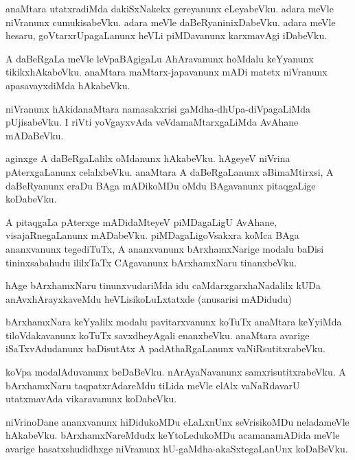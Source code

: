 \documentclass{article}
\begin{document}
\begin{mn}%
anaMtara utatxradiMda dakiSxNakekx gereyanunx eLeyabeVku. adara meVle
niVranunx cumukisabeVku. adara meVle daBeRyaninixDabeVku. adara meVle
hesaru, goVtarxrUpagaLanunx heVLi piMDavanunx karxmavAgi iDabeVku.
\end{mn}

\begin{mn}%
A daBeRgaLa meVle leVpaBAgigaLu AhAravanunx hoMdalu keYyanunx
tikikxhAkabeVku. anaMtara maMtarx-japavanunx mADi matetx niVranunx
apasavayxdiMda hAkabeVku.
\end{mn}

\begin{mn}
niVranunx hAkidanaMtara namasakxrisi gaMdha-dhUpa-diVpagaLiMda
pUjisabeVku. I riVti yoVgayxvAda veVdamaMtarxgaLiMda AvAhane mADaBeVku.
\end{mn}

\begin{mn}
aginxge A daBeRgaLalilx oMdanunx hAkabeVku. hAgeyeV niVrina
pAterxgaLanunx celalxbeVku. anaMtara A daBeRgaLanunx aBimaMtirxsi, A
daBeRyanunx eraDu BAga mADikoMDu oMdu BAgavanunx pitaqgaLige koDabeVku.
\end{mn}

\begin{mn}%
A pitaqgaLa pAterxge mADidaMteyeV piMDagaLigU AvAhane,
visajaRnegaLanunx mADabeVku. piMDagaLigoVsakxra koMca BAga ananxvanunx
tegediTuTx, A ananxvanunx bArxhamxNarige modalu baDisi tininxsabahudu
ililxTaTx CAgavanunx bArxhamxNaru tinanxbeVku.
\end{mn}

\begin{mn}%
hAge  bArxhamxNaru tinunxvudariMda idu caMdarxgarxhaNadalilx kUDa
anAvxhArayxkaveMdu heVLisikoLuLxtatxde (anusarisi mADidudu)
\end{mn}

\begin{mn}
bArxhamxNara keYyalilx modalu pavitarxvanunx koTuTx anaMtara keYyiMda
tiloVdakavanunx koTuTx savxdheyAgali enanxbeVku. anaMtara avarige
iSaTxvAdudanunx baDisutAtx A padAthaRgaLanunx vaNiRsutitxrabeVku.
\end{mn}

\begin{mn}
koVpa modalAduvanunx beDaBeVku. nArAyaNavanunx samxrisutitxrabeVku. A
bArxhamxNaru taqpatxrAdareMdu tiLida meVle elAlx vaNaRdavarU
utatxmavAda vikaravanunx koDabeVku.
\end{mn}

\begin{mn}
niVrinoDane ananxvanunx hiDidukoMDu eLaLxnUnx seVrisikoMDu neladameVle
hAkabeVku. bArxhamxNareMdudx keYtoLedukoMDu acamanamADida meVle
avarige hasatxshudidhxge niVranunx hU-gaMdha-akaSxtegaLanUnx koDaBeVku.
\end{mn}
\end{document}
